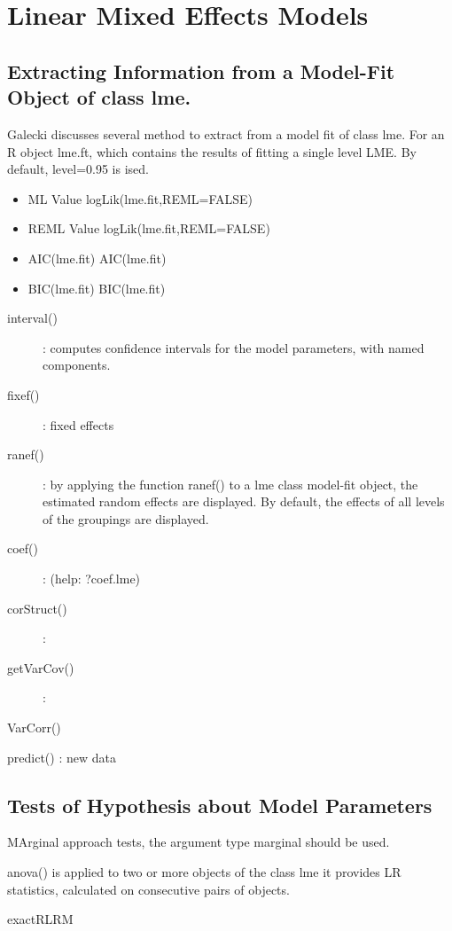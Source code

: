 \section{Linear Mixed Effects Models}
\subsection{Extracting Information from a Model-Fit Object of class lme.}


Galecki discusses several method to extract from a model fit of class lme.
For an R object lme.ft, which contains the results of fitting a single level LME.
By default, level=0.95 is ised.
\begin{itemize}
\item ML Value logLik(lme.fit,REML=FALSE)
\item REML Value logLik(lme.fit,REML=FALSE)
\item AIC(lme.fit) AIC(lme.fit)
\item BIC(lme.fit) BIC(lme.fit)
\end{itemize}

\begin{description}
\item[interval()]: computes confidence intervals for the model parameters, with named components.
\item[fixef()]: fixed effects
\item[ranef()]: by applying the function ranef() to a lme class model-fit object, the estimated random
effects are displayed. By default, the effects of all levels of the groupings are displayed.
\item[coef()]:  (help: ?coef.lme)
\item[corStruct()]: 
\item[getVarCov()]:
\item[VarCorr()]
\end{description}

predict() : new data


\subsection{Tests of Hypothesis about Model Parameters}
MArginal approach tests, the argument type marginal should be used.



anova() is applied to two or more objects of the class lme it provides LR statistics, calculated on consecutive pairs of objects.





exactRLRM

